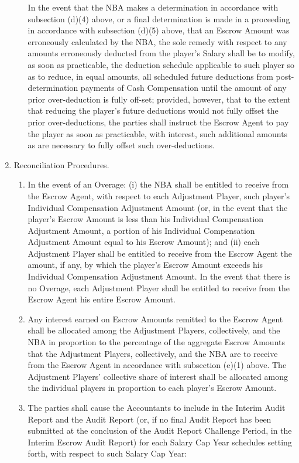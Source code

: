 \documentclass[
]{book}
\providecommand{\tightlist}{%
  \setlength{\itemsep}{0pt}\setlength{\parskip}{0pt}}
\begin{document}
\begin{enumerate}
\begin{enumerate}
    In the event that the NBA makes a determination in accordance with subsection (d)(4) above, or a final determination is made in a proceeding in accordance with subsection (d)(5) above, that an Escrow Amount was erroneously calculated by the NBA, the sole remedy with respect to any amounts erroneously deducted from the player's Salary shall be to modify, as soon as practicable, the deduction schedule applicable to such player so as to reduce, in equal amounts, all scheduled future deductions from post-determination payments of Cash Compensation until the amount of any prior over-deduction is fully off-set; provided, however, that to the extent that reducing the player's future deductions would not fully offset the prior over-deductions, the parties shall instruct the Escrow Agent to pay the player as soon as practicable, with interest, such additional amounts as are necessary to fully offset such over-deductions.
  \end{enumerate}
\item
  Reconciliation Procedures.

  \begin{enumerate}
  \def\labelenumii{(\arabic{enumii})}
  \tightlist
  \item
    In the event of an Overage: (i) the NBA shall be entitled to receive from the Escrow Agent, with respect to each Adjustment Player, such player's Individual Compensation Adjustment Amount (or, in the event that the player's Escrow Amount is less than his Individual Compensation Adjustment Amount, a portion of his Individual Compensation Adjustment Amount equal to his Escrow Amount); and (ii) each Adjustment Player shall be entitled to receive from the Escrow Agent the amount, if any, by which the player's Escrow Amount exceeds his Individual Compensation Adjustment Amount. In the event that there is no Overage, each Adjustment Player shall be entitled to receive from the Escrow Agent his entire Escrow Amount.
  \item
    Any interest earned on Escrow Amounts remitted to the Escrow Agent shall be allocated among the Adjustment Players, collectively, and the NBA in proportion to the percentage of the aggregate Escrow Amounts that the Adjustment Players, collectively, and the NBA are to receive from the Escrow Agent in accordance with subsection (e)(1) above. The Adjustment Players' collective share of interest shall be allocated among the individual players in proportion to each player's Escrow Amount.
  \item
    The parties shall cause the Accountants to include in the Interim Audit Report and the Audit Report (or, if no final Audit Report has been submitted at the conclusion of the Audit Report Challenge Period, in the Interim Escrow Audit Report) for each Salary Cap Year schedules setting forth, with respect to such Salary Cap Year:


\end{enumerate}
\end{enumerate}
\end{document}
